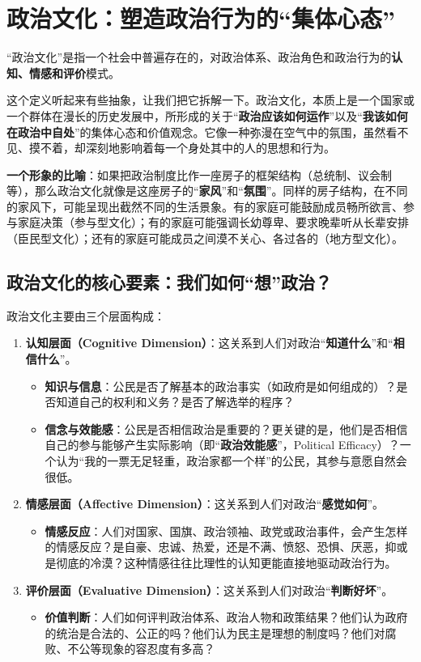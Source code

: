 \hrulefill

\section{政治文化：塑造政治行为的“集体心态”}

“政治文化”是指一个社会中普遍存在的，对政治体系、政治角色和政治行为的\textbf{认知、情感和评价}模式。

这个定义听起来有些抽象，让我们把它拆解一下。政治文化，本质上是一个国家或一个群体在漫长的历史发展中，所形成的关于“\textbf{政治应该如何运作}”以及“\textbf{我该如何在政治中自处}”的集体心态和价值观念。它像一种弥漫在空气中的氛围，虽然看不见、摸不着，却深刻地影响着每一个身处其中的人的思想和行为。

\textbf{一个形象的比喻}：如果把政治制度比作一座房子的框架结构（总统制、议会制等），那么政治文化就像是这座房子的“\textbf{家风}”和“\textbf{氛围}”。同样的房子结构，在不同的家风下，可能呈现出截然不同的生活景象。有的家庭可能鼓励成员畅所欲言、参与家庭决策（参与型文化）；有的家庭可能强调长幼尊卑、要求晚辈听从长辈安排（臣民型文化）；还有的家庭可能成员之间漠不关心、各过各的（地方型文化）。

\subsection{政治文化的核心要素：我们如何“想”政治？}

政治文化主要由三个层面构成：

\begin{enumerate}
    \item \textbf{认知层面（Cognitive Dimension）}：这关系到人们对政治“\textbf{知道什么}”和“\textbf{相信什么}”。
    \begin{itemize}
        \item \textbf{知识与信息}：公民是否了解基本的政治事实（如政府是如何组成的）？是否知道自己的权利和义务？是否了解选举的程序？
        \item \textbf{信念与效能感}：公民是否相信政治是重要的？更关键的是，他们是否相信自己的参与能够产生实际影响（即“\textbf{政治效能感}”，Political Efficacy）？一个认为“我的一票无足轻重，政治家都一个样”的公民，其参与意愿自然会很低。
    \end{itemize}
    \item \textbf{情感层面（Affective Dimension）}：这关系到人们对政治“\textbf{感觉如何}”。
    \begin{itemize}
        \item \textbf{情感反应}：人们对国家、国旗、政治领袖、政党或政治事件，会产生怎样的情感反应？是自豪、忠诚、热爱，还是不满、愤怒、恐惧、厌恶，抑或是彻底的冷漠？这种情感往往比理性的认知更能直接地驱动政治行为。
    \end{itemize}
    \item \textbf{评价层面（Evaluative Dimension）}：这关系到人们对政治“\textbf{判断好坏}”。
    \begin{itemize}
        \item \textbf{价值判断}：人们如何评判政治体系、政治人物和政策结果？他们认为政府的统治是合法的、公正的吗？他们认为民主是理想的制度吗？他们对腐败、不公等现象的容忍度有多高？
    \end{itemize}
\end{enumerate}

